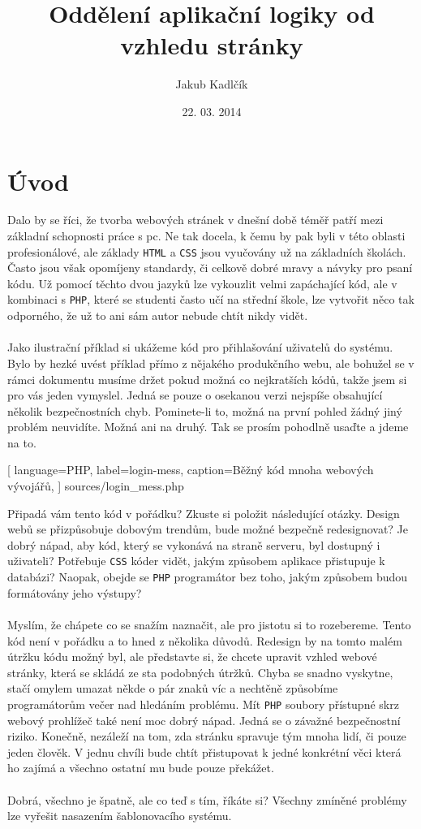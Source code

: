 \documentclass[10pt,a4paper]{article}
\title{Oddělení aplikační logiky od vzhledu stránky}
\author{Jakub Kadlčík}
\date{22. 03. 2014}
\begin{document}
	\maketitle
	\newpage

	\tableofcontents
	\newpage

	\section{Úvod}
	\label{uvod}
	Dalo by se říci, že tvorba webových stránek v dnešní době téměř patří mezi základní schopnosti práce s pc. Ne tak docela, k čemu by pak byli v této oblasti profesionálové, ale základy \texttt{HTML} a \texttt{CSS} jsou vyučovány už na základních školách. Často jsou však opomíjeny standardy, či celkově dobré mravy a návyky pro psaní kódu. Už pomocí těchto dvou jazyků lze vykouzlit velmi zapáchající kód, ale v kombinaci s \texttt{PHP}, které se studenti často učí na střední škole, lze vytvořit něco tak odporného, že už to ani sám autor nebude chtít nikdy vidět.
	\\
	\\
	Jako ilustrační příklad si ukážeme kód pro přihlašování uživatelů do systému. Bylo by hezké uvést příklad přímo z nějakého produkčního webu, ale bohužel se v rámci dokumentu musíme držet pokud možná co nejkratších kódů, takže jsem si pro vás jeden vymyslel. Jedná se pouze o osekanou verzi nejspíše obsahující několik bezpečnostních chyb. Pominete-li to, možná na první pohled žádný jiný problém neuvidíte. Možná ani na druhý. Tak se prosím pohodlně usaďte a jdeme na to.

	
	[
		language=PHP,
		label=login-mess,
		caption={Běžný kód mnoha webových vývojářů},
	] {sources/login_mess.php}
	\vspace{10pt}

	Připadá vám tento kód v pořádku? Zkuste si položit následující otázky. Design webů se přizpůsobuje dobovým trendům, bude možné bezpečně redesignovat? Je dobrý nápad, aby kód, který se vykonává na straně serveru, byl dostupný i uživateli? Potřebuje \texttt{CSS} kóder vidět, jakým způsobem aplikace přistupuje k databázi? Naopak, obejde se \texttt{PHP} programátor bez toho, jakým způsobem budou formátovány jeho výstupy?
	\\
	\\
	Myslím, že chápete co se snažím naznačit, ale pro jistotu si to rozebereme. Tento kód není v pořádku a to hned z několika důvodů. Redesign by na tomto malém útržku kódu možný byl, ale představte si, že chcete upravit vzhled webové stránky, která se skládá ze sta podobných útržků. Chyba se snadno vyskytne, stačí omylem umazat někde o pár znaků víc a nechtěně způsobíme programátorům  večer nad hledáním problému. Mít \texttt{PHP} soubory přístupné skrz webový prohlížeč také není moc dobrý nápad. Jedná se o závažné bezpečnostní riziko. Konečně, nezáleží na tom, zda stránku spravuje tým mnoha lidí, či pouze jeden člověk. V jednu chvíli bude chtít přistupovat k jedné konkrétní věci která ho zajímá a všechno ostatní mu bude pouze překážet.
	\\
	\\
	Dobrá, všechno je špatně, ale co teď s tím, říkáte si? Všechny zmíněné problémy lze vyřešit nasazením šablonovacího systému.
\end{document}
